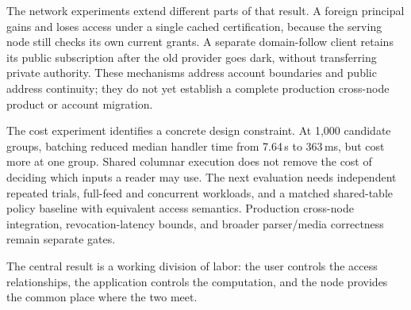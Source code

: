 \documentclass[sigconf, nonacm]{acmart}
\begin{document}
The network experiments extend different parts of that result. A foreign
principal gains and loses access under a single cached certification,
because the serving node still checks its own current grants. A separate
domain-follow client retains its public subscription after the old
provider goes dark, without transferring private authority. These
mechanisms address account boundaries and public address continuity;
they do not yet establish a complete production cross-node product or
account migration.

The cost experiment identifies a concrete design constraint. At 1,000
candidate groups, batching reduced median handler time from 7.64\,s to
363\,ms, but cost more at one group. Shared columnar execution does not
remove the cost of deciding which inputs a reader may use. The next
evaluation needs independent repeated trials, full-feed and concurrent
workloads, and a matched shared-table policy baseline with equivalent
access semantics. Production cross-node integration, revocation-latency
bounds, and broader parser/media correctness remain separate gates.

The central result is a working division of labor: the user controls the
access relationships, the application controls the computation, and the
node provides the common place where the two meet.



\end{document}
